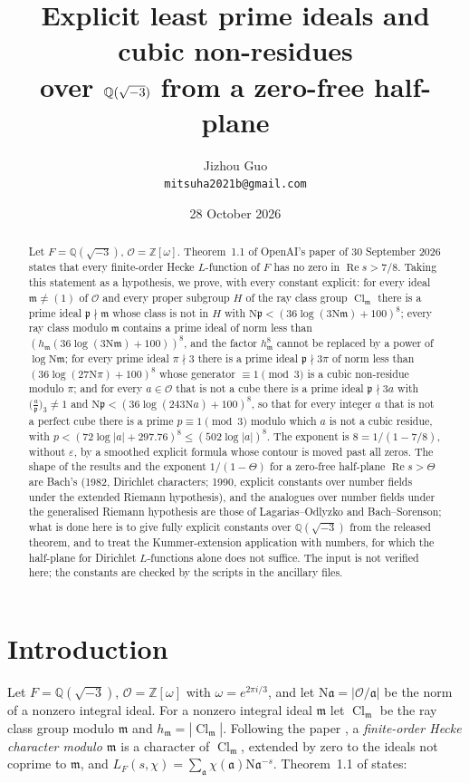 \documentclass[11pt]{article}
\title{Explicit least prime ideals and cubic non-residues\protect\\over $\Q(\sqrt{-3})$ from a zero-free half-plane}
\author{Jizhou Guo\\\texttt{mitsuha2021b@gmail.com}}
\date{28 October 2026}
\theoremstyle{definition}
\theoremstyle{remark}
\numberwithin{equation}{section}
\newcommand{\Q}{\mathbb Q}
\newcommand{\Z}{\mathbb Z}
\newcommand{\cO}{\mathcal O}
\newcommand{\fa}{\mathfrak a}
\newcommand{\fp}{\mathfrak p}
\newcommand{\fm}{\mathfrak m}
\newcommand{\Nm}{\mathrm N}
\newcommand{\Cl}{\operatorname{Cl}}
\newcommand{\Rea}{\operatorname{Re}}
\newcommand{\cubic}[2]{\bigl(\tfrac{#1}{#2}\bigr)_{3}}
\begin{document}
\maketitle

\begin{abstract}
Let $F=\Q(\sqrt{-3})$, $\cO=\Z[\omega]$. Theorem~1.1 of OpenAI's paper of 30 September 2026 states that every finite-order Hecke $L$-function of $F$ has no zero in $\Rea s>7/8$. Taking this statement as a hypothesis, we prove, with every constant explicit: for every ideal $\fm\ne(1)$ of $\cO$ and every proper subgroup $H$ of the ray class group $\Cl_\fm$ there is a prime ideal $\fp\nmid\fm$ whose class is not in $H$ with $\Nm\fp<(36\log(3\Nm\fm)+100)^8$; every ray class modulo $\fm$ contains a prime ideal of norm less than $(h_\fm(36\log(3\Nm\fm)+100))^8$, and the factor $h_\fm^8$ cannot be replaced by a power of $\log\Nm\fm$; for every prime ideal $\pi\nmid3$ there is a prime ideal $\fp\nmid3\pi$ of norm less than $(36\log(27\Nm\pi)+100)^8$ whose generator $\equiv1\pmod3$ is a cubic non-residue modulo $\pi$; and for every $a\in\cO$ that is not a cube there is a prime ideal $\fp\nmid3a$ with $\cubic{a}{\fp}\ne1$ and $\Nm\fp<(36\log(243\Nm a)+100)^8$, so that for every integer $a$ that is not a perfect cube there is a prime $p\equiv1\pmod3$ modulo which $a$ is not a cubic residue, with $p<(72\log|a|+297.76)^8\le(502\log|a|)^8$. The exponent is $8=1/(1-7/8)$, without $\varepsilon$, by a smoothed explicit formula whose contour is moved past all zeros. The shape of the results and the exponent $1/(1-\Theta)$ for a zero-free half-plane $\Rea s>\Theta$ are Bach's (1982, Dirichlet characters; 1990, explicit constants over number fields under the extended Riemann hypothesis), and the analogues over number fields under the generalised Riemann hypothesis are those of Lagarias--Odlyzko and Bach--Sorenson; what is done here is to give fully explicit constants over $\Q(\sqrt{-3})$ from the released theorem, and to treat the Kummer-extension application with numbers, for which the half-plane for Dirichlet $L$-functions alone does not suffice. The input is not verified here; the constants are checked by the scripts in the ancillary files.
\end{abstract}

\section{Introduction}\label{sec:intro}

Let $F=\Q(\sqrt{-3})$, $\cO=\Z[\omega]$ with $\omega=e^{2\pi i/3}$, and let $\Nm\fa=|\cO/\fa|$ be the norm of a nonzero integral ideal. For a nonzero integral ideal $\fm$ let $\Cl_\fm$ be the ray class group modulo $\fm$ and $h_\fm=|\Cl_\fm|$. Following the paper \cite{openai2026q}, a \emph{finite-order Hecke character modulo $\fm$} is a character of $\Cl_\fm$, extended by zero to the ideals not coprime to $\fm$, and $L_F(s,\chi)=\sum_\fa\chi(\fa)\Nm\fa^{-s}$. Theorem~1.1 of \cite{openai2026q} states:
\end{document}
